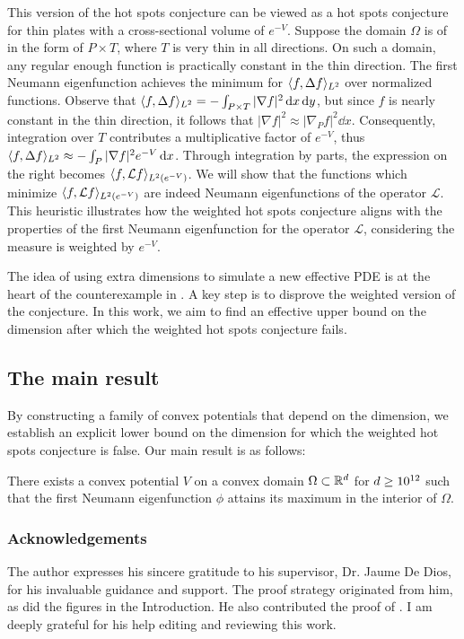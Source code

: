 This version of the hot spots conjecture can be viewed as a hot spots conjecture for thin plates with a cross-sectional volume of \( e^{-V} \). Suppose the domain $\Omega$ is of in the form of $P \times T$, where $T$ is very thin in all directions. On such a domain, any regular enough function is practically constant in the thin direction. The first Neumann eigenfunction achieves the minimum for $\langle f, \Delta f \rangle_{L^2}$ over normalized functions. Observe that $\langle f, \Delta f \rangle_{L^2} = -\int_{P \times T} |\nabla f|^2 \dd{x} \dd{y}$, but since $f$ is nearly constant in the thin direction, it follows that $|\nabla f|^2 \approx |\nabla_{P} f|^2 \dd{x}$. Consequently, integration over $T$ contributes a multiplicative factor of $e^{-V}$, thus $\langle f, \Delta f \rangle_{L^2} \approx -\int_{P} |\nabla f|^2 e^{-V} \dd{x}$. Through integration by parts, the expression on the right becomes $\langle f, \mathcal{L} f \rangle_{L^2(e^{-V})}$. We will show that the functions which minimize $\langle f, \mathcal{L} f \rangle_{L^2(e^{-V})}$ are indeed Neumann eigenfunctions of the operator $\mathcal{L}$. This heuristic illustrates how the weighted hot spots conjecture aligns with the properties of the first Neumann eigenfunction for the operator $\mathcal{L}$, considering the measure is weighted by $e^{-V}$.

The idea of using extra dimensions to simulate a new effective PDE is at the heart of the counterexample in \cite{pont_convex_2024}. A key step is to disprove the weighted version of the conjecture. In this work, we aim to find an effective upper bound on the dimension after which the weighted hot spots conjecture fails.

\subsection{The main result}

By constructing a family of convex potentials that depend on the dimension, we establish an explicit lower bound on the dimension for which the weighted hot spots conjecture is false. Our main result is as follows:

\begin{theorem}
There exists a convex potential $V$ on a convex domain $\Omega \subset \mathbb{R}^d$ for $d \ge 10^{12}$ such that the first Neumann eigenfunction $\phi$ attains its maximum in the interior of $\Omega$.
\end{theorem}

\subsubsection*{Acknowledgements}
The author expresses his sincere gratitude to his supervisor, Dr. Jaume De Dios, for his invaluable guidance and support. The proof strategy originated from him, as did the figures in the Introduction. He also contributed the proof of . I am deeply grateful for his help editing and reviewing this work.

